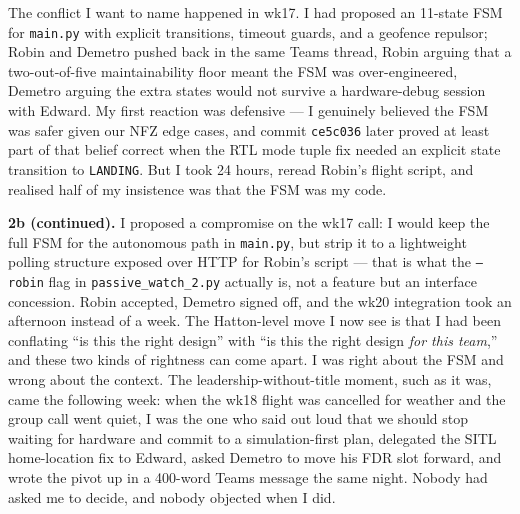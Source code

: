 The conflict I want to name happened in wk17. I had proposed an 11-state FSM for \texttt{main.py} with explicit transitions, timeout guards, and a geofence repulsor; Robin and Demetro pushed back in the same Teams thread, Robin arguing that a two-out-of-five maintainability floor meant the FSM was over-engineered, Demetro arguing the extra states would not survive a hardware-debug session with Edward. My first reaction was defensive --- I genuinely believed the FSM was safer given our NFZ edge cases, and commit \texttt{ce5c036} later proved at least part of that belief correct when the RTL mode tuple fix needed an explicit state transition to \texttt{LANDING}. But I took 24 hours, reread Robin's flight script, and realised half of my insistence was that the FSM was my code.

\textbf{2b (continued).} I proposed a compromise on the wk17 call: I would keep the full FSM for the autonomous path in \texttt{main.py}, but strip it to a lightweight polling structure exposed over HTTP for Robin's script --- that is what the \texttt{--robin} flag in \texttt{passive\_watch\_2.py} actually is, not a feature but an interface concession. Robin accepted, Demetro signed off, and the wk20 integration took an afternoon instead of a week. The Hatton-level move I now see is that I had been conflating ``is this the right design'' with ``is this the right design \emph{for this team},'' and these two kinds of rightness can come apart. I was right about the FSM and wrong about the context. The leadership-without-title moment, such as it was, came the following week: when the wk18 flight was cancelled for weather and the group call went quiet, I was the one who said out loud that we should stop waiting for hardware and commit to a simulation-first plan, delegated the SITL home-location fix to Edward, asked Demetro to move his FDR slot forward, and wrote the pivot up in a 400-word Teams message the same night. Nobody had asked me to decide, and nobody objected when I did.

